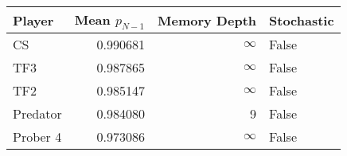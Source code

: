 \begin{tabular}{lrrl}
\toprule
   Player &  Mean $p_{N-1}$ &  Memory Depth & Stochastic \\
\midrule
       CS &        0.990681 &            \(\infty\) &      False \\
      TF3 &        0.987865 &            \(\infty\) &      False \\
      TF2 &        0.985147 &            \(\infty\) &      False \\
 Predator &        0.984080 &             9 &      False \\
 Prober 4 &        0.973086 &            \(\infty\) &      False \\
\bottomrule
\end{tabular}
